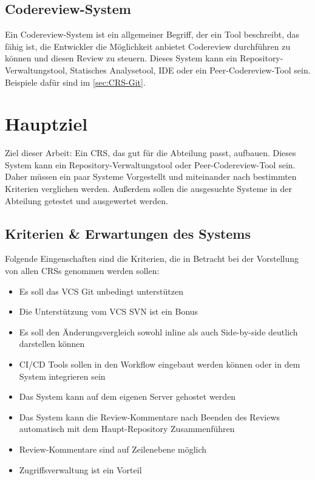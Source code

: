\subsection{Codereview-System}
\label{subsec:CRS}

Ein Codereview-System ist ein allgemeiner Begriff, der ein Tool beschreibt, das fähig ist, die Entwickler die Möglichkeit anbietet Codereview durchführen zu können und diesen Review zu steuern. Dieses System kann ein Repository-Verwaltungstool, Statisches Analysetool, IDE oder ein Peer-Codereview-Tool sein. Beispiele dafür sind im \cref{sec:CRS-Git}.

\section{Hauptziel}
\label{sec:Ziel}

Ziel dieser Arbeit: Ein \ac{CRS}, das gut für die Abteilung passt, aufbauen. Dieses System kann ein Repository-Verwaltungstool oder Peer-Codereview-Tool sein. Daher müssen ein paar Systeme Vorgestellt und miteinander nach bestimmten Kriterien verglichen werden. Außerdem sollen die ausgesuchte Systeme in der Abteilung getestet und ausgewertet werden.


\subsection{Kriterien \& Erwartungen des Systems}
\label{sec:kriterien}

Folgende Eingenschaften sind die Kriterien, die in Betracht bei der Vorstellung von allen \acp{CRS} genommen werden sollen:

\begin{itemize}
	\item Es soll das \ac{VCS} Git unbedingt unterstützen
	\item Die Unterstützung vom \ac{VCS} \ac{SVN} ist ein Bonus
	\item Es soll den Änderungsvergleich sowohl inline als auch Side-by-side deutlich darstellen können
	\item \ac{CI}/\ac{CD} Tools sollen in den Workflow eingebaut werden können oder in dem System integrieren sein
	\item Das System kann auf dem eigenen Server gehostet werden
	\item Das System kann die Review-Kommentare nach Beenden des Reviews automatisch mit dem Haupt-Repository Zusammenführen
	\item Review-Kommentare sind auf Zeilenebene möglich
	\item Zugriffsverwaltung ist ein Vorteil
\end{itemize}
